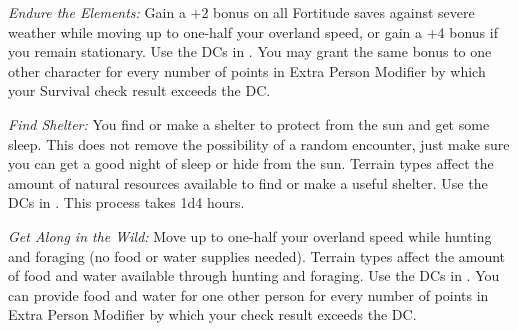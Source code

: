 \textit{Endure the Elements:} Gain a +2 bonus on all Fortitude saves against severe weather while moving up to one-half your overland speed, or gain a +4 bonus if you remain stationary. Use the DCs in . You may grant the same bonus to one other character for every number of points in Extra Person Modifier by which your Survival check result exceeds the DC.


\textit{Find Shelter:} You find or make a shelter to protect from the sun and get some sleep. This does not remove the possibility of a random encounter, just make sure you can get a good night of sleep or hide from the sun. Terrain types affect the amount of natural resources available to find or make a useful shelter. Use the DCs in . This process takes 1d4 hours.


\textit{Get Along in the Wild:} Move up to one-half your overland speed while hunting and foraging (no food or water supplies needed). Terrain types affect the amount of food and water available through hunting and foraging. Use the DCs in . You can provide food and water for one other person for every number of points in Extra Person Modifier by which your check result exceeds the DC.

